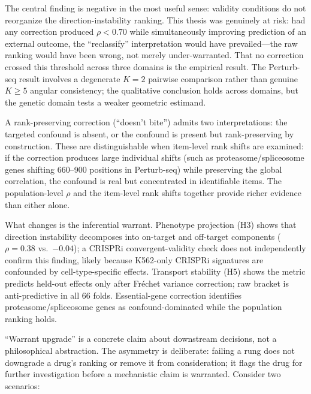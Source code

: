 \documentclass[11pt]{article}
\begin{document}
The central finding is negative in the most useful sense: validity conditions
do not reorganize the direction-instability ranking. This thesis was
genuinely at risk: had any correction produced $\rho < 0.70$ while
simultaneously improving prediction of an external outcome, the
``reclassify'' interpretation would have prevailed---the raw ranking
would have been wrong, not merely under-warranted. That no correction
crossed this threshold across three domains is the empirical result.
The Perturb-seq result involves a degenerate $K = 2$ pairwise comparison
rather than genuine $K \geq 5$ angular consistency; the qualitative
conclusion holds across domains, but the genetic domain tests a weaker
geometric estimand.

A rank-preserving correction (``doesn't bite'') admits two
interpretations: the targeted confound is absent, or the confound is
present but rank-preserving by construction. These are distinguishable
when item-level rank shifts are examined: if the correction produces
large individual shifts (such as proteasome/spliceosome genes shifting
660--900 positions in Perturb-seq) while preserving the global
correlation, the confound is real but concentrated in identifiable items.
The population-level $\rho$ and the item-level rank shifts together
provide richer evidence than either alone.

What changes is the inferential warrant. Phenotype projection (H3) shows
that direction instability decomposes into on-target and off-target
components ($\rho = 0.38$ vs.\ $-0.04$); a CRISPRi convergent-validity
check does not independently confirm this finding, likely because
K562-only CRISPRi signatures are confounded by cell-type-specific
effects. Transport stability (H5) shows
the metric predicts held-out effects only after Fr\'{e}chet variance
correction; raw bracket is anti-predictive in all 66 folds. Essential-gene
correction identifies proteasome/spliceosome genes as confound-dominated
while the population ranking holds.

``Warrant upgrade'' is a concrete claim about downstream decisions, not
a philosophical abstraction. The asymmetry is deliberate: failing a
rung does not downgrade a drug's ranking or remove it from consideration;
it flags the drug for further investigation before a mechanistic claim
is warranted. Consider two scenarios:
\end{document}
